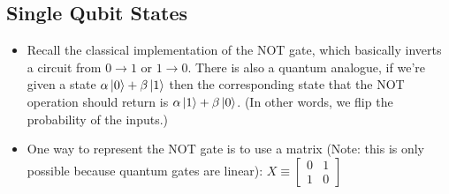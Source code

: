 \subsection{Single Qubit States}
\begin{itemize}
	\item Recall the classical implementation of the NOT gate, which basically inverts a circuit from 
		\( 0 \to 1 \) or \( 1 \to 0 \). There is also a quantum analogue, if we're given 
		a state \( \alpha\ket{0} + \beta\ket{1} \) then the corresponding state that the NOT operation 
		should return is \( \alpha \ket{1} + \beta\ket{0} \). (In other words, we flip the probability 
		of the inputs.)
	\item One way to represent the NOT gate is to use a matrix (Note: this is only possible because 
		quantum gates are linear):
		\( X \equiv \begin{bmatrix} 0 & 1\\ 1& 0  \end{bmatrix}  \)



\end{itemize}
